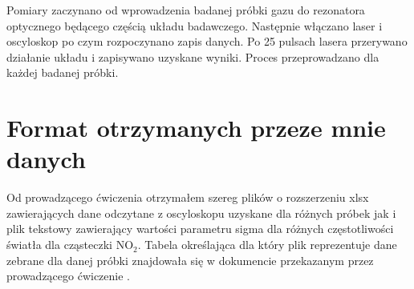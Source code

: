 \documentclass[10pt,a4paper]{article}
\begin{document}
Pomiary zaczynano od wprowadzenia badanej próbki gazu do rezonatora optycznego będącego częścią układu badawczego. Następnie włączano laser i oscyloskop po czym rozpoczynano zapis danych. Po 25 pulsach lasera przerywano działanie układu i zapisywano uzyskane wyniki. Proces przeprowadzano dla każdej badanej próbki.

\section{Format otrzymanych przeze mnie danych} 

Od prowadzącego ćwiczenia otrzymałem szereg plików o rozszerzeniu xlsx zawierających dane odczytane z oscyloskopu uzyskane dla różnych próbek jak i plik tekstowy zawierający wartości parametru sigma dla różnych częstotliwości światła dla cząsteczki $\text{NO}_{\text{2}}$. Tabela określająca dla który plik reprezentuje dane zebrane dla danej próbki znajdowała się w  dokumencie przekazanym przez prowadzącego ćwiczenie \cite{sswo}.
\end{document}
